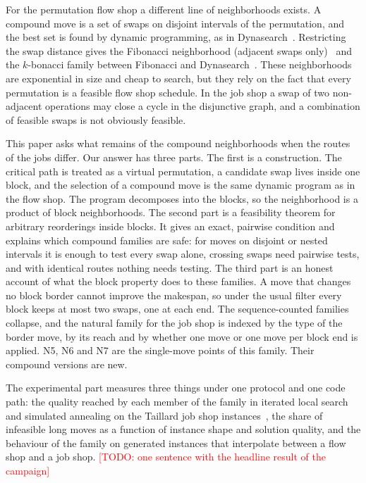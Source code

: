 \documentclass[10pt,twocolumn]{article}
\newcommand{\todo}[1]{\textcolor{red}{[TODO: #1]}}
\begin{document}
For the permutation flow shop a different line of neighborhoods exists. A
compound move is a set of swaps on disjoint intervals of the permutation,
and the best set is found by dynamic programming, as in
Dynasearch~\cite{congram2002}. Restricting the swap distance gives the
Fibonacci neighborhood (adjacent swaps only)~\cite{fibonacci_own} and the
$k$-bonacci family between Fibonacci and
Dynasearch~\cite{kbonacci_own}. These neighborhoods are exponential in
size and cheap to search, but they rely on the fact that every permutation
is a feasible flow shop schedule. In the job shop a swap of two
non-adjacent operations may close a cycle in the disjunctive graph, and a
combination of feasible swaps is not obviously feasible.

This paper asks what remains of the compound neighborhoods when the routes
of the jobs differ. Our answer has three parts. The first is a
construction. The critical path is treated as a virtual permutation, a
candidate swap lives inside one block, and the selection of a compound
move is the same dynamic program as in the flow shop. The program
decomposes into the blocks, so the neighborhood is a product of block
neighborhoods. The second part is a feasibility theorem for arbitrary
reorderings inside blocks. It gives an exact, pairwise condition and
explains which compound families are safe: for moves on disjoint or nested
intervals it is enough to test every swap alone, crossing swaps need
pairwise tests, and with identical routes nothing needs testing. The third
part is an honest account of what the block property does to these
families. A move that changes no block border cannot improve the makespan,
so under the usual filter every block keeps at most two swaps, one at each
end. The sequence-counted families collapse, and the natural family for
the job shop is indexed by the type of the border move, by its reach and
by whether one move or one move per block end is applied. N5, N6 and N7
are the single-move points of this family. Their compound versions are
new.

The experimental part measures three things under one protocol and one
code path: the quality reached by each member of the family in iterated
local search and simulated annealing on the Taillard job shop
instances~\cite{taillard1993}, the share of infeasible long moves as a
function of instance shape and solution quality, and the behaviour of the
family on generated instances that interpolate between a flow shop and a
job shop. \todo{one sentence with the headline result of the campaign}
\end{document}
